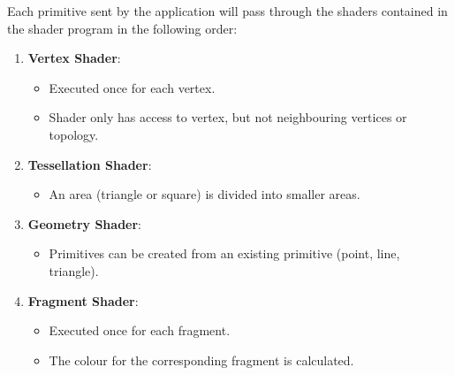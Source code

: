 \documentclass[11pt]{article}
\begin{document}
Each primitive sent by the application will pass through the shaders contained in the shader program in the following order:
\begin{enumerate}
  \item \textbf{Vertex Shader}:
    \begin{itemize}
      \item Executed once for each vertex.
      \item Shader only has access to vertex, but not neighbouring vertices or topology.
    \end{itemize}
  \item \textbf{Tessellation Shader}:
    \begin{itemize}
      \item An area (triangle or square) is divided into smaller areas.
    \end{itemize}
  \item \textbf{Geometry Shader}:
    \begin{itemize}
      \item Primitives can be created from an existing primitive (point, line, triangle).
    \end{itemize}
  \item \textbf{Fragment Shader}:
    \begin{itemize}
      \item Executed once for each fragment.
      \item The colour for the corresponding fragment is calculated.
    \end{itemize}
\end{enumerate}
\end{document}
